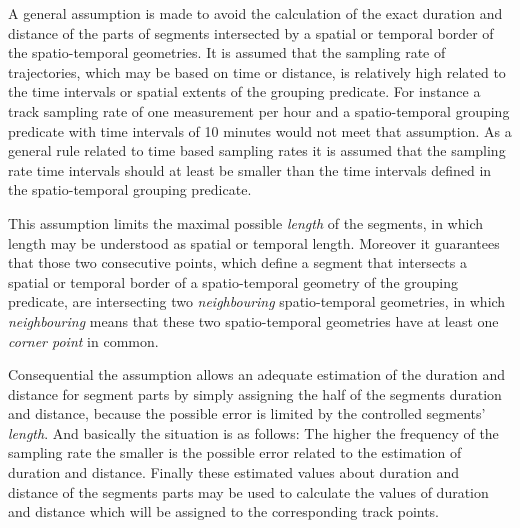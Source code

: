 \documentclass[12pt, oneside, a4paper]{scrbook}
\let\code=\texttt
\begin{document}
A general assumption is made to avoid the calculation of the exact duration and distance of the parts of segments intersected by a spatial or temporal border of the spatio-temporal geometries. 
It is assumed that the sampling rate of trajectories, which may be based on time or distance, is relatively high related to the time intervals or spatial extents of the grouping predicate. 
For instance a track sampling rate of one measurement per hour and a spatio-temporal grouping predicate with time intervals of 10 minutes would not meet that assumption. 
As a general rule related to time based sampling rates it is assumed that the sampling rate time intervals should at least be smaller than the time intervals defined in the spatio-temporal grouping predicate. 
\par\medskip

This assumption limits the maximal possible \textit{length} of the segments, in which length may be understood as spatial or temporal length.
Moreover it guarantees that those two consecutive points, which define a segment that intersects a spatial or temporal border of a spatio-temporal geometry of the grouping predicate, are intersecting two \textit{neighbouring} spatio-temporal geometries, in which \textit{neighbouring} means that these two spatio-temporal geometries have at least one \textit{corner point} in common.
\par\medskip

Consequential the assumption allows an adequate estimation of the duration and distance for segment parts by simply assigning the half of the segments duration and distance, because the possible error is limited by the controlled segments' \textit{length}. And basically the situation is as follows: The higher the frequency of the sampling rate the smaller is the possible error related to the estimation of duration and distance.
Finally these estimated values about duration and distance of the segments parts may be used to calculate the values of duration and distance which will be assigned to the corresponding track points.
\par\medskip

\end{document}
